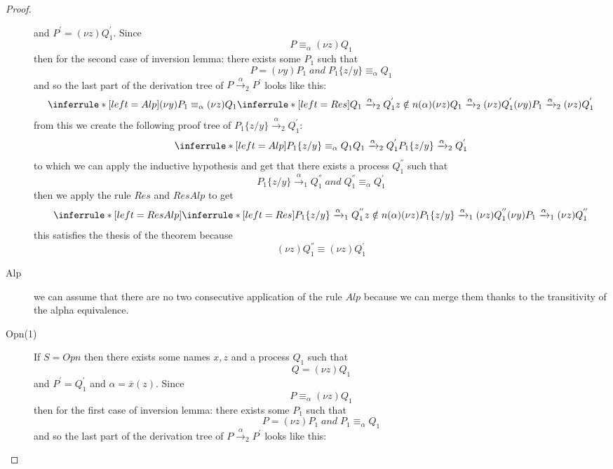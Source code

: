 \begin{theorem}
\begin{proof}
\begin{description}
\[	    \]
	    and $P^{'}=(\nu z)Q_{1}^{'}$. Since 
	    \[
	      P\equiv_{\alpha}(\nu z)Q_{1}
	    \]
	    then for the second case of inversion lemma:
		there exists some $P_{1}$ such that 
		\[
		  P=(\nu y)P_{1}\; and\; P_{1}\{z/y\}\equiv_{\alpha}Q_{1}
		\]
		and so the last part of the derivation tree of $P\xrightarrow{\alpha}_{2}P^{'}$ looks like this:
		\[
		  \inferrule* [left=Alp]{
		      (\nu y)P_{1}\equiv_{\alpha}(\nu z)Q_{1}
		    \\
		      \inferrule* [left=Res]{
			  Q_{1}\xrightarrow{\alpha}_{2}Q_{1}^{'}
			\\
			  z\notin n(\alpha)
		      }{
			(\nu z)Q_{1}\xrightarrow{\alpha}_{2}(\nu z)Q_{1}^{'}
		      }
		  }{
		    (\nu y)P_{1}\xrightarrow{\alpha}_{2}(\nu z)Q_{1}^{'}
		  }
		\]
		from this we create the following proof tree of $P_{1}\{z/y\}\xrightarrow{\alpha}_{2}Q_{1}^{'}$:
		\[
		  \inferrule* [left=Alp]{
		      P_{1}\{z/y\}\equiv_{\alpha}Q_{1}
		    \\
		      Q_{1}\xrightarrow{\alpha}_{2}Q_{1}^{'}
		  }{
		    P_{1}\{z/y\}\xrightarrow{\alpha}_{2}Q_{1}^{'}
		  }		
		\]
		to which we can apply the inductive hypothesis and get that there exists a process $Q_{1}^{''}$ such that
		\[
		  P_{1}\{z/y\}\xrightarrow{\alpha}_{1}Q_{1}^{''}\;and\; Q_{1}^{''}\equiv_{\alpha}Q_{1}^{'}
		\]
		then we apply the rule $Res$ and $ResAlp$ to get
		\[
		  \inferrule* [left=ResAlp]{
		      \inferrule* [left=Res]{
			  P_{1}\{z/y\} \xrightarrow{\alpha}_{1}Q_{1}^{''}
			\\
			  z\notin n(\alpha)
		      }{
			(\nu z)P_{1}\{z/y\} \xrightarrow{\alpha}_{1}(\nu z)Q_{1}^{''}
		      }		 
		  }{
		    (\nu y)P_{1} \xrightarrow{\alpha}_{1}(\nu z)Q_{1}^{''}
		  }
		\]
		this satisfies the thesis of the theorem because  
		\[
		  (\nu z)Q_{1}^{''}\equiv(\nu z)Q_{1}^{'}
		\]
	  \item[Alp]
	    we can assume that there are no two consecutive application of the rule $Alp$ because we can merge them thanks to the transitivity of the alpha equivalence.
	  \item[Opn(1)]
	    If $S=Opn$ then there exists some names $x,z$ and a process $Q_{1}$ such that 
	    \[
	      Q=(\nu z)Q_{1}
	    \]
	    and $P^{'}=Q_{1}^{'}$ and $\alpha=\overline{x}(z)$. Since 
	    \[
	      P\equiv_{\alpha}(\nu z)Q_{1}
	    \]
	    then for the first case of inversion lemma:
		there exists some $P_{1}$ such that 
		\[
		  P=(\nu z)P_{1}\; and\; P_{1}\equiv_{\alpha}Q_{1}
		\]
		and so the last part of the derivation tree of $P\xrightarrow{\alpha}_{2}P^{'}$ looks like this:

\end{description}
\end{proof}
\end{theorem}

